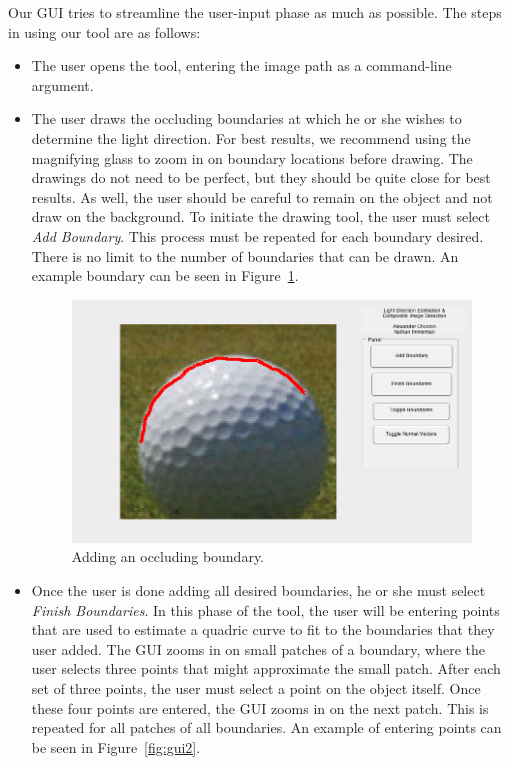 \documentclass[10pt,twocolumn,letterpaper]{article}
\begin{document}
Our GUI tries to streamline the user-input phase as much as possible. The steps in using our tool are as follows:
\begin{itemize}
\item The user opens the tool, entering the image path as a command-line argument.

\item The user draws the occluding boundaries at which he or she wishes to determine the light direction. For best results, we recommend using the magnifying glass to zoom in on boundary locations before drawing. The drawings do not need to be perfect, but they should be quite close for best results. As well, the user should be careful to remain on the object and not draw on the background. To initiate the drawing tool, the user must select \emph{Add Boundary}. This process must be repeated for each boundary desired. There is no limit to the number of boundaries that can be drawn. An example boundary can be seen in Figure~\ref{fig:gui1}.

\begin{figure}[]
\begin{center}
	\includegraphics[width=0.9\linewidth]{gui1.png}
\end{center}
	\caption{Adding an occluding boundary.}
\label{fig:gui1}
\end{figure}

\item Once the user is done adding all desired boundaries, he or she must select \emph{Finish Boundaries}. In this phase of the tool, the user will be entering points that are used to estimate a quadric curve to fit to the boundaries that they user added. The GUI zooms in on small patches of a boundary, where the user selects three points that might approximate the small patch. After each set of three points, the user must select a point on the object itself. Once these four points are entered, the GUI zooms in on the next patch. This is repeated for all patches of all boundaries. An example of entering points can be seen in Figure~\ref{fig:gui2}.


\end{itemize}
\end{document}
